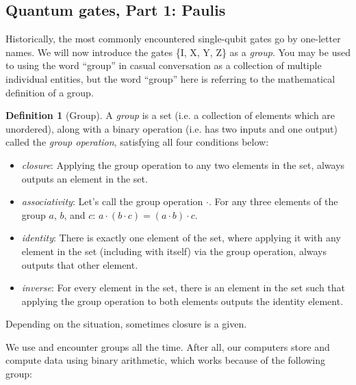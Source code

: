 \documentclass{article}
\theoremstyle{definition}
\newtheorem{definition}{Definition}
\begin{document}
\subsection{Quantum gates, Part 1: Paulis}
Historically, the most commonly encountered single-qubit gates go by one-letter names.
We will now introduce the gates \{I, X, Y, Z\} as a \textit{group}.
You may be used to using the word ``group'' in casual conversation as a collection of multiple individual entities, but the word ``group'' here is referring to the mathematical definition of a group.

\begin{definition}[Group]
	\label{def:group}
	A \textit{group} is a set (i.e. a collection of elements which are unordered), along with a binary operation (i.e. has two inputs and one output) called the \textit{group operation}, satisfying all four conditions below:
	\begin{itemize}
		\item \textit{closure}: Applying the group operation to any two elements in the set, always outputs an element in the set.
		\item \textit{associativity}: Let's call the group operation $\cdot$.  For any three elements of the group $a$, $b$, and $c$: $a \cdot (b \cdot c) = (a \cdot b) \cdot c$.
		\item \textit{identity}: There is exactly one element of the set, where applying it with any element in the set (including with itself) via the group operation, always outputs that other element.
		\item \textit{inverse}: For every element in the set, there is an element in the set such that applying the group operation to both elements outputs the identity element.
	\end{itemize}
\end{definition}
Depending on the situation, sometimes closure is a given.

We use and encounter groups all the time.  After all, our computers store and compute data using binary arithmetic, which works because of the following group:
\end{document}
